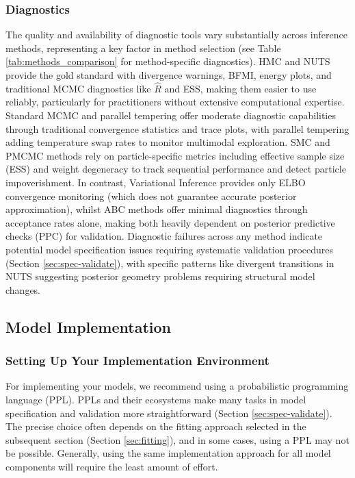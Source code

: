 \documentclass{article}
\begin{document}
\subsubsection{Diagnostics}

The quality and availability of diagnostic tools vary substantially across inference methods, representing a key factor in method selection (see Table \ref{tab:methods_comparison} for method-specific diagnostics).
HMC and NUTS provide the gold standard with divergence warnings, BFMI, energy plots, and traditional MCMC diagnostics like $\hat{R}$ and ESS, making them easier to use reliably, particularly for practitioners without extensive computational expertise.
Standard MCMC and parallel tempering offer moderate diagnostic capabilities through traditional convergence statistics and trace plots, with parallel tempering adding temperature swap rates to monitor multimodal exploration.
SMC and PMCMC methods rely on particle-specific metrics including effective sample size (ESS) and weight degeneracy to track sequential performance and detect particle impoverishment. 
In contrast, Variational Inference provides only ELBO convergence monitoring (which does not guarantee accurate posterior approximation), whilst ABC methods offer minimal diagnostics through acceptance rates alone, making both heavily dependent on posterior predictive checks (PPC) for validation.
Diagnostic failures across any method indicate potential model specification issues requiring systematic validation procedures (Section \ref{sec:spec-validate}), with specific patterns like divergent transitions in NUTS suggesting posterior geometry problems requiring structural model changes.

\subsection{Model Implementation}\label{sec:implementation}

\subsubsection{Setting Up Your Implementation Environment}

For implementing your models, we recommend using a probabilistic programming language (PPL).
PPLs and their ecosystems make many tasks in model specification and validation more straightforward (Section \ref{sec:spec-validate}).
The precise choice often depends on the fitting approach selected in the subsequent section (Section \ref{sec:fitting}), and in some cases, using a PPL may not be possible.
Generally, using the same implementation approach for all model components will require the least amount of effort.
\end{document}
